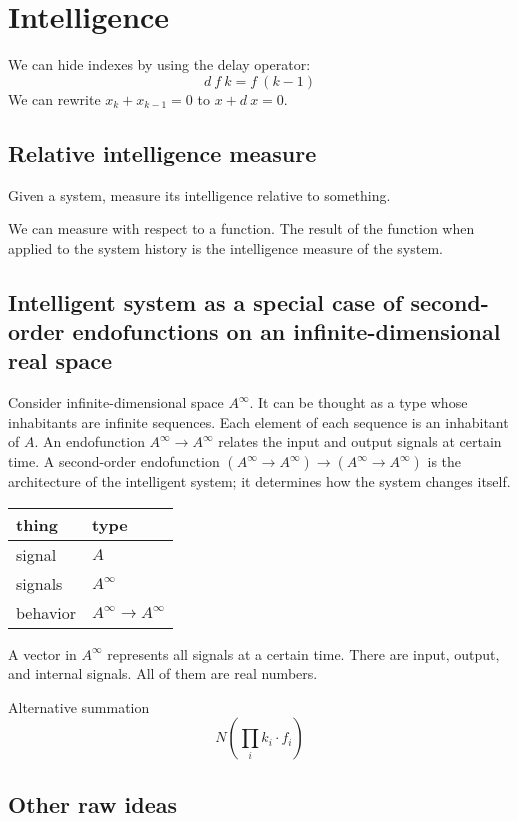 \chapter{Intelligence}

We can hide indexes by using the delay operator:
\[
    d~f~k = f~(k-1)
\]
We can rewrite
\( x_k + x_{k-1} = 0 \)
to
\(x + d~x = 0\).

\section{Relative intelligence measure}

Given a system, measure its intelligence relative to something.

We can measure with respect to a function.
The result of the function when applied to the system history
is the intelligence measure of the system.

\section{Intelligent system as a special case of second-order endofunctions on an infinite-dimensional real space}

Consider infinite-dimensional space \(A^\infty\).
It can be thought as a type whose inhabitants are infinite sequences.
Each element of each sequence is an inhabitant of \(A\).
An endofunction \(A^\infty \to A^\infty\) relates the input and output signals at certain time.
A second-order endofunction \((A^\infty \to A^\infty) \to (A^\infty \to A^\infty)\) is the architecture of the intelligent system;
it determines how the system changes itself.

\begin{center}
    \begin{tabular}{ll}
        thing & type
        \\
        \hline
        signal & \(A\)
        \\
        signals & \(A^\infty\)
        \\
        behavior & \(A^\infty \to A^\infty\)
    \end{tabular}
\end{center}

A vector in \(A^\infty\) represents all signals at a certain time.
There are input, output, and internal signals.
All of them are real numbers.

Alternative summation
\[
    N \left( \prod_i k_i \cdot f_i \right)
\]

\section{Other raw ideas}

